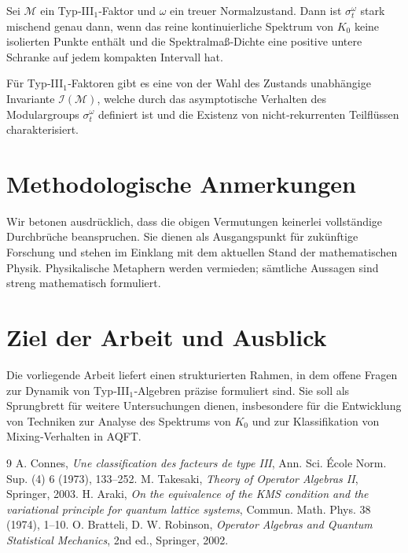 \documentclass[12pt, a4paper]{article}
\begin{document}
\begin{hypothesis}
Sei $\mathcal{M}$ ein Typ‑III$_1$‑Faktor und $\omega$ ein treuer Normalzustand. Dann ist $\sigma_t^{\omega}$ stark mischend genau dann, wenn das reine kontinuierliche Spektrum von $K_0$ keine isolierten Punkte enthält und die Spektralmaß‑Dichte eine positive untere Schranke auf jedem kompakten Intervall hat.
\end{hypothesis}

\begin{hypothesis}
Für Typ‑III$_1$‑Faktoren gibt es eine von der Wahl des Zustands unabhängige Invariante $\mathcal{I}(\mathcal{M})$, welche durch das asymptotische Verhalten des Modulargroups $\sigma_t^{\omega}$ definiert ist und die Existenz von nicht‑rekurrenten Teilflüssen charakterisiert.
\end{hypothesis}

\section{Methodologische Anmerkungen}
Wir betonen ausdrücklich, dass die obigen Vermutungen keinerlei vollständige Durchbrüche beanspruchen. Sie dienen als Ausgangspunkt für zukünftige Forschung und stehen im Einklang mit dem aktuellen Stand der mathematischen Physik. Physikalische Metaphern werden vermieden; sämtliche Aussagen sind streng mathematisch formuliert.

\section{Ziel der Arbeit und Ausblick}
Die vorliegende Arbeit liefert einen strukturierten Rahmen, in dem offene Fragen zur Dynamik von Typ‑III$_1$‑Algebren präzise formuliert sind. Sie soll als Sprungbrett für weitere Untersuchungen dienen, insbesondere für die Entwicklung von Techniken zur Analyse des Spektrums von $K_0$ und zur Klassifikation von Mixing‑Verhalten in AQFT.

\begin{thebibliography}{9}
 A. Connes, \emph{Une classification des facteurs de type III}, Ann. Sci. École Norm. Sup. (4) 6 (1973), 133–252.
 M. Takesaki, \emph{Theory of Operator Algebras II}, Springer, 2003.
 H. Araki, \emph{On the equivalence of the KMS condition and the variational principle for quantum lattice systems}, Commun. Math. Phys. 38 (1974), 1–10.
 O. Bratteli, D. W. Robinson, \emph{Operator Algebras and Quantum Statistical Mechanics}, 2nd ed., Springer, 2002.
\end{thebibliography}
\end{document}
